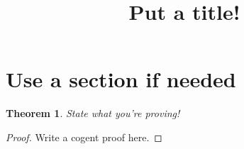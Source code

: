 \documentclass{article}
\title{Put a title!}
\newtheorem{theorem}{Theorem}
\begin{document}
\maketitle

\section*{Use a section if needed}
\begin{theorem}
State what you're proving!
\end{theorem}

\begin{proof}
Write a cogent proof here.
\end{proof}
\end{document}
